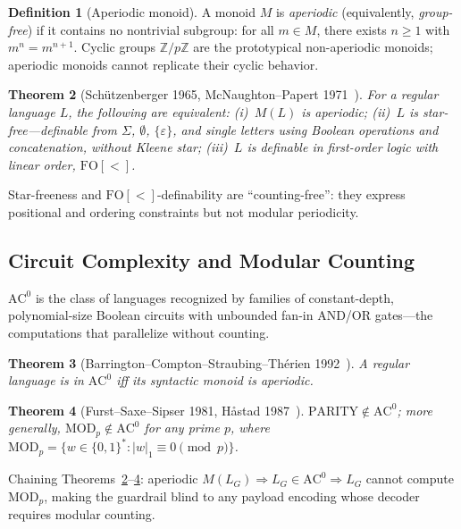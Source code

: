 \documentclass[letterpaper,twocolumn,10pt]{article}
\newtheorem{theorem}{Theorem}[section]
\theoremstyle{definition}
\newtheorem{definition}[theorem]{Definition}
\theoremstyle{remark}
\begin{document}
\begin{definition}[Aperiodic monoid]\label{def:aperiodic}
A monoid $M$ is \emph{aperiodic} (equivalently, \emph{group-free}) if it
contains no nontrivial subgroup: for all $m \in M$, there exists $n \geq 1$
with $m^n = m^{n+1}$.
Cyclic groups $\mathbb{Z}/p\mathbb{Z}$ are the prototypical non-aperiodic
monoids; aperiodic monoids cannot replicate their cyclic behavior.
\end{definition}

\begin{theorem}[Sch\"{u}tzenberger 1965, McNaughton--Papert 1971~{\cite{schutzenberger1965,mcnaughton1971}}]\label{thm:smp}
For a regular language $L$, the following are equivalent:
(i)~$M(L)$ is aperiodic;
(ii)~$L$ is \emph{star-free}---definable from $\Sigma$, $\emptyset$,
$\{\varepsilon\}$, and single letters using Boolean operations and
concatenation, without Kleene star;
(iii)~$L$ is definable in first-order logic with linear order,
$\mathrm{FO}[{<}]$.
\end{theorem}

Star-freeness and $\mathrm{FO}[{<}]$-definability are ``counting-free'':
they express positional and ordering constraints but not modular periodicity.

\subsection{Circuit Complexity and Modular Counting}\label{sec:circuit-complexity}

$\mathrm{AC}^0$ is the class of languages recognized by families of
constant-depth, polynomial-size Boolean circuits with unbounded fan-in AND/OR
gates---the computations that parallelize without counting.

\begin{theorem}[Barrington--Compton--Straubing--Th\'{e}rien 1992~{\cite{barrington1992}}]\label{thm:bcst}
A regular language is in $\mathrm{AC}^0$ iff its syntactic monoid is aperiodic.
\end{theorem}

\begin{theorem}[Furst--Saxe--Sipser 1981, H\r{a}stad 1987~{\cite{furst1981,hastad1987}}]\label{thm:fss}
$\mathrm{PARITY} \notin \mathrm{AC}^0$; more generally, $\mathrm{MOD}_p \notin
\mathrm{AC}^0$ for any prime $p$, where $\mathrm{MOD}_p = \{w \in \{0,1\}^* :
|w|_1 \equiv 0 \pmod{p}\}$.
\end{theorem}

Chaining Theorems~\ref{thm:smp}--\ref{thm:fss}: aperiodic $M(L_G) \Rightarrow
L_G \in \mathrm{AC}^0 \Rightarrow L_G$ cannot compute $\mathrm{MOD}_p$, making
the guardrail blind to any payload encoding whose decoder requires modular
counting.
\end{document}
